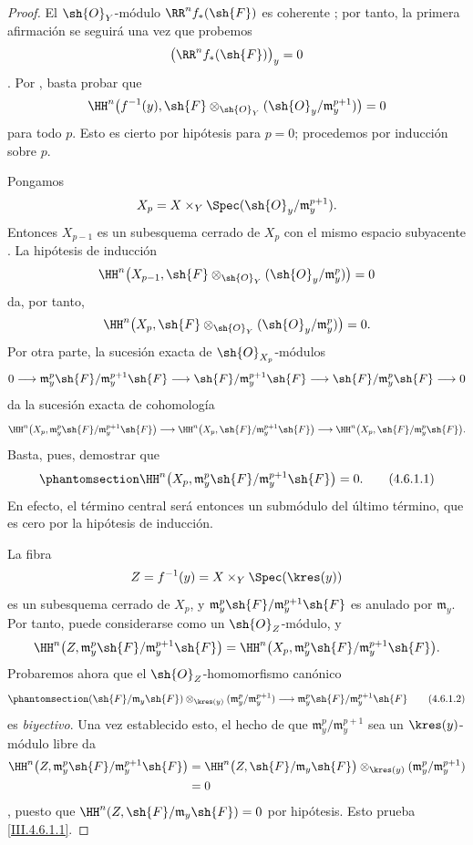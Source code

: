 \documentclass[oneside]{amsart}
\newcommand{\oldpage}[2][]{{\marginnote{\normalfont\textbf{#1}~|~#2}}\ignorespaces}
\let\EGAOriginalLabel\label
\renewcommand{\label}[1]{\phantomsection\EGAOriginalLabel{#1}}
\begin{document}
\begin{proof}
El $\sh{O}_Y$-módulo $\RR^n f_*(\sh{F})$ es coherente
; por tanto, la primera afirmación se seguirá una vez que probemos
\[
  \bigl(\RR^n f_*(\sh{F})\bigr)_y=0
\]
. Por , basta probar que
\[
  \HH^n\bigl(f^{-1}(y),
    \sh{F}\otimes_{\sh{O}_Y}
      (\sh{O}_y/\mathfrak m_y^{p+1})\bigr)=0
\]
para todo $p$. Esto es cierto por hipótesis para $p=0$; procedemos por
inducción sobre $p$.

Pongamos
\[
  X_p=X\times_Y
    \Spec(\sh{O}_y/\mathfrak m_y^{p+1}).
\]
Entonces $X_{p-1}$ es un subesquema cerrado de $X_p$ con el mismo
espacio subyacente . La hipótesis de inducción
\[
  \HH^n\bigl(X_{p-1},
    \sh{F}\otimes_{\sh{O}_Y}
      (\sh{O}_y/\mathfrak m_y^p)\bigr)=0
\]
da, por tanto,
\[
  \HH^n\bigl(X_p,
    \sh{F}\otimes_{\sh{O}_Y}
      (\sh{O}_y/\mathfrak m_y^p)\bigr)=0.
\]
Por otra parte, la sucesión exacta de $\sh{O}_{X_p}$-módulos
\[
  0\longrightarrow
  \mathfrak m_y^p\sh{F}/\mathfrak m_y^{p+1}\sh{F}
  \longrightarrow
  \sh{F}/\mathfrak m_y^{p+1}\sh{F}
  \longrightarrow
  \sh{F}/\mathfrak m_y^p\sh{F}
  \longrightarrow0
\]
da la sucesión exacta de cohomología
\[
  \HH^n\bigl(X_p,
    \mathfrak m_y^p\sh{F}/\mathfrak m_y^{p+1}\sh{F}\bigr)
  \longrightarrow
  \HH^n\bigl(X_p,\sh{F}/\mathfrak m_y^{p+1}\sh{F}\bigr)
  \longrightarrow
  \HH^n\bigl(X_p,\sh{F}/\mathfrak m_y^p\sh{F}\bigr).
\]
Basta, pues, demostrar que
\[
\label{III.4.6.1.1}
  \HH^n\bigl(X_p,
    \mathfrak m_y^p\sh{F}/\mathfrak m_y^{p+1}\sh{F}\bigr)=0.
  \tag{4.6.1.1}
\]
En efecto, el término central será entonces un submódulo del último término,
que es cero por la hipótesis de inducción.

\oldpage[III]{140}

La fibra
\[
  Z=f^{-1}(y)=X\times_Y\Spec(\kres(y))
\]
es un subesquema cerrado de $X_p$, y
$\mathfrak m_y^p\sh{F}/\mathfrak m_y^{p+1}\sh{F}$ es anulado por
$\mathfrak m_y$. Por tanto, puede considerarse como un
$\sh{O}_Z$-módulo, y
\[
  \HH^n\bigl(Z,
    \mathfrak m_y^p\sh{F}/\mathfrak m_y^{p+1}\sh{F}\bigr)
  =
  \HH^n\bigl(X_p,
    \mathfrak m_y^p\sh{F}/\mathfrak m_y^{p+1}\sh{F}\bigr).
\]
Probaremos ahora que el $\sh{O}_Z$-homomorfismo canónico
\[
\label{III.4.6.1.2}
  (\sh{F}/\mathfrak m_y\sh{F})
    \otimes_{\kres(y)}
      (\mathfrak m_y^p/\mathfrak m_y^{p+1})
  \longrightarrow
  \mathfrak m_y^p\sh{F}/\mathfrak m_y^{p+1}\sh{F}
  \tag{4.6.1.2}
\]
es \emph{biyectivo}. Una vez establecido esto, el hecho de que
$\mathfrak m_y^p/\mathfrak m_y^{p+1}$ sea un
$\kres(y)$-módulo libre da
\[
\begin{split}
  \HH^n\bigl(Z,
    \mathfrak m_y^p\sh{F}/\mathfrak m_y^{p+1}\sh{F}\bigr)
  &=
  \HH^n\bigl(Z,\sh{F}/\mathfrak m_y\sh{F}\bigr)
    \otimes_{\kres(y)}
      (\mathfrak m_y^p/\mathfrak m_y^{p+1})\\
  &=0
\end{split}
\]
, puesto que
$\HH^n(Z,\sh{F}/\mathfrak m_y\sh{F})=0$ por hipótesis. Esto prueba
\eqref{III.4.6.1.1}.


\end{proof}
\end{document}
